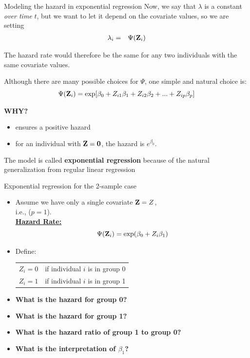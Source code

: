 \documentclass[envcountsect, 10pt, portrait, palatino]{beamer}
\newcommand{\bfZ}{{\mbox{{\bf Z}}}}
\begin{document}
\begin{frame}{Modeling the hazard in exponential regression}
Now, we say that $\lambda$ is a constant {\em over time} $t$, but we
want to let it depend on the covariate values, so we are setting
\begin{eqnarray*}
\lambda_i & = & \Psi(\bfZ_i)
\end{eqnarray*}

The hazard rate would therefore be the same for any two individuals
with the same covariate values.

Although there are many possible choices for $\Psi$, one simple and
natural choice is:
\[\Psi(\bfZ_i) =
\exp[ \beta_0 + Z_{i1} \beta_1 + Z_{i2} \beta_2 + ... + Z_{ip} \beta_p] \]

{\bf WHY?}
\begin{itemize}
\item ensures a positive hazard
\item for an individual with ${\bfZ}={\bf 0}$, the hazard is
$e^{\beta_0}$.
\end{itemize}
The model is called {\bf exponential regression} because of
the natural generalization from regular linear regression
\end{frame} 
\begin{frame}{Exponential regression for the 2-sample case}

\begin{itemize}
\item Assume we have only a single covariate $\bfZ=Z$,\\
i.e., ($p=1$).\\

\underline{\bf Hazard Rate:}
\[\Psi(\bfZ_i) = \exp( \beta_0 + Z_i \beta_1 ) \]

\item Define:~~~~
\begin{tabular}{ll}
$Z_{i}= 0$  & if individual $i$ is in group 0\\
$Z_{i}= 1$  & if individual $i$ is in group 1\\
\end{tabular}

\item {\bf What is the hazard for group 0?}
\item {\bf What is the hazard for group 1?}
\item {\bf What is the hazard ratio of group 1 to group 0?}
\item {\bf What is the interpretation of $\beta_1$?}
\end{itemize}
\end{frame} 
\end{document}
